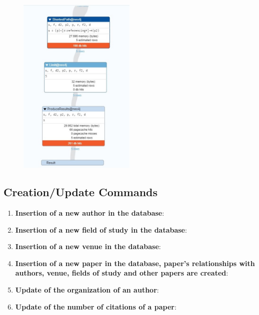 \documentclass{Configuration_Files/PoliMi3i_thesis}
\begin{document}
\begin{enumerate}
\begin{figure}[H]
    \end{figure}
    \begin{figure}[H]
    \centering
     \includegraphics[width=0.5\textwidth]{Images/queries_neo4j/query_10_p3.jpg}
     \end{figure}
\end{enumerate}
\subsection{Creation/Update Commands}
\begin{enumerate}
\item \textbf{Insertion of a new author in the database}:
    
\item \textbf{Insertion of a new field of study in the database}:
    
\item \textbf{Insertion of a new venue in the database}:
    
\item \textbf{Insertion of a new paper in the database, paper's relationships with authors, venue, fields of study and other papers are created}:
    
\item \textbf{Update of the organization of an author}:
    
\item \textbf{Update of the number of citations of a paper}:
    
\end{enumerate}
\end{document}
